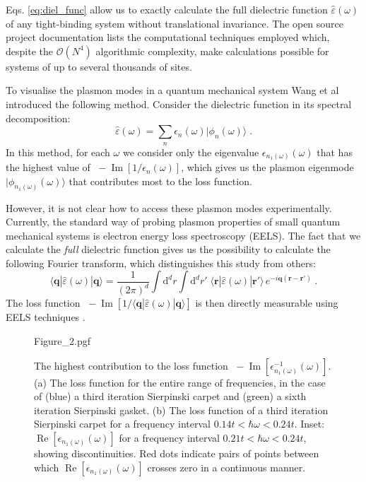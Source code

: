 Eqs. \eqref{eq:diel_func} allow us to exactly calculate the full dielectric function $\hat\varepsilon(\omega)$ of any tight-binding system without translational invariance. The open source project documentation \cite{Westerhout2017} lists the computational techniques employed which, despite the $\mathcal{O}(N^4)$ algorithmic complexity, make calculations possible for systems of up to several thousands of sites.

To visualise the plasmon modes in a quantum mechanical system Wang et al \cite{plasmonic2015} introduced the following method. Consider the dielectric function in its spectral decomposition:
\begin{equation}
    \hat\varepsilon(\omega) = \sum_n \epsilon_n(\omega)|\phi_n(\omega)\rangle
        \;.
\end{equation}
In this method, for each $\omega$ we consider only the eigenvalue $\epsilon_{n_1(\omega)}(\omega)$ that has the highest value of $\;-\operatorname{Im}[1/\epsilon_n(\omega)]$, which gives us the plasmon eigenmode $|\phi_{n_1(\omega)}(\omega)\rangle$ that contributes most to the loss function.

However, it is not clear how to access these plasmon modes experimentally. Currently, the standard way of probing plasmon properties of small quantum mechanical systems is electron energy loss spectroscopy (EELS).  The fact that we calculate the \emph{full} dielectric function gives us the possibility to calculate the following Fourier transform, which distinguishes this study from others:
\begin{equation}
    \langle\mathbf{q} |\hat\varepsilon(\omega)| \mathbf{q}\rangle
        = \frac{1}{(2\pi)^d} \int\!\!\text{d}^d r \!\!\!\int\!\!\text{d}^d r'\;
            \langle\mathbf{r} |\hat\varepsilon(\omega)| \mathbf{r'}\rangle\,
                e^{-i\mathbf{q}(\mathbf{r} - \mathbf{r'})} \; .
\end{equation}
The loss function $\; -\operatorname{Im}[1 / \langle\mathbf{q}|\hat\varepsilon(\omega)| \mathbf{q}\rangle]$ is then directly measurable using EELS techniques \cite{nozieres1999theory,platzman1973waves,Vonsov2012QuantumSolidS,giuliani2005quantum,lu2009plasmon}.

\begin{figure}[h]
    \centering
    {Figure_2.pgf}
    \caption{
        The highest contribution to the loss function
        $\;-\operatorname{Im}[\epsilon^{-1}_{n_1(\omega)} (\omega)]$. (a) The
        loss function for the entire range of frequencies, in the case of (blue)
        a third iteration  Sierpinski carpet and (green) a sixth iteration
        Sierpinski gasket. (b) The loss function of a third iteration
        Sierpinski carpet for a frequency interval $0.14t < \hbar\omega <
        0.24t$. Inset: $\operatorname{Re}[\epsilon_{n_1(\omega)} (\omega)]$ for
        a frequency interval $0.21t < \hbar\omega < 0.24t$, showing
        discontinuities. Red dots indicate pairs of points between which
        $\operatorname{Re}[\epsilon_{n_1(\omega)}(\omega)]$ crosses zero in a
        continuous manner.
    }
    \label{fig:prb18:spectrum}
\end{figure}

